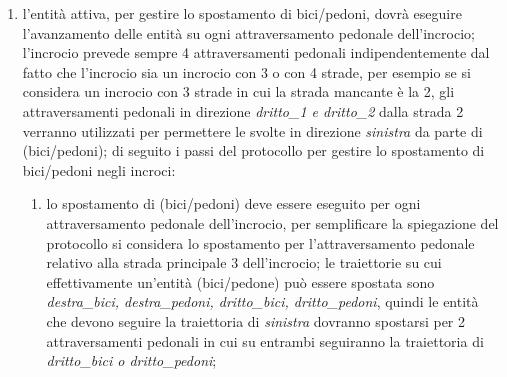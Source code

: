 \begin{enumerate}
\item l'entità attiva, per gestire lo spostamento di bici/pedoni, dovrà eseguire
l'avanzamento delle entità su ogni attraversamento pedonale dell'incrocio; l'incrocio prevede sempre 4 attraversamenti pedonali indipendentemente dal fatto che l'incrocio sia un incrocio con 3 o con 4 strade, per esempio se si considera un incrocio con 3 strade in cui la strada mancante è la 2, gli attraversamenti pedonali in direzione \textit{dritto\_1 e dritto\_2} dalla strada 2 verranno utilizzati per permettere le svolte in direzione \textit{sinistra} da parte di (bici/pedoni); di seguito i passi del protocollo per gestire lo spostamento di bici/pedoni negli incroci:
\begin{enumerate}
\item lo spostamento di (bici/pedoni) deve essere eseguito per ogni attraversamento pedonale dell'incrocio, per semplificare la spiegazione del protocollo si considera lo spostamento per l'attraversamento pedonale relativo alla strada principale 3 dell'incrocio; le traiettorie su cui effettivamente un'entità (bici/pedone) può essere spostata sono \textit{des\-tra\_bi\-ci, des\-tra\_pe\-do\-ni, drit\-to\_bi\-ci, drit\-to\_pe\-do\-ni}, quindi le entità che devono seguire la traiettoria di \textit{sinistra} dovranno spostarsi per 2 attraversamenti pedonali in cui su entrambi seguiranno la traiettoria di \textit{drit\-to\_bi\-ci o drit\-to\_pe\-do\-ni};

\end{enumerate}
\end{enumerate}
